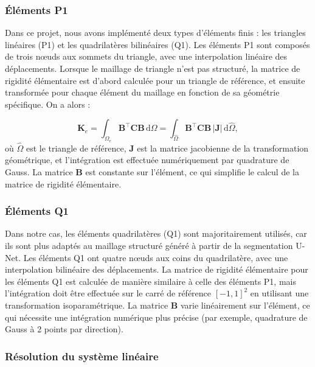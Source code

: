 \documentclass[a4paper,11pt]{article}
\begin{document}
\subsubsection*{Éléments P1}

Dans ce projet, nous avons implémenté deux types d'éléments finis : les triangles linéaires (P1) et les quadrilatères bilinéaires (Q1). Les éléments P1 sont composés de trois nœuds aux sommets du triangle, avec une interpolation linéaire des déplacements. Lorsque le maillage de triangle n'est pas structuré, la matrice de rigidité élémentaire est d'abord calculée pour un triangle de référence, et ensuite transformée pour chaque élément du maillage en fonction de sa géométrie spécifique. On a alors :

\begin{equation}
\mathbf{K}_e = \int_{\Omega_e} \mathbf{B}^\top \mathbf{C}\mathbf{B}\,\mathrm{d}\Omega = \int_{\hat{\Omega}} \mathbf{B}^\top \mathbf{C}\mathbf{B}\,|\mathbf{J}|\,\mathrm{d}\hat{\Omega},
\end{equation}
où $\hat{\Omega}$ est le triangle de référence, $\mathbf{J}$ est la matrice jacobienne de la transformation géométrique, et l'intégration est effectuée numériquement par quadrature de Gauss. La matrice $\mathbf{B}$ est constante sur l'élément, ce qui simplifie le calcul de la matrice de rigidité élémentaire.

\subsubsection*{Éléments Q1}

Dans notre cas, les éléments quadrilatères (Q1) sont majoritairement utilisés, car ils sont plus adaptés au maillage structuré généré à partir de la segmentation U-Net. Les éléments Q1 ont quatre nœuds aux coins du quadrilatère, avec une interpolation bilinéaire des déplacements. La matrice de rigidité élémentaire pour les éléments Q1 est calculée de manière similaire à celle des éléments P1, mais l'intégration doit être effectuée sur le carré de référence $[-1,1]^2$ en utilisant une transformation isoparamétrique. La matrice $\mathbf{B}$ varie linéairement sur l'élément, ce qui nécessite une intégration numérique plus précise (par exemple, quadrature de Gauss à 2 points par direction). \\

\subsubsection*{Résolution du système linéaire}
\end{document}
